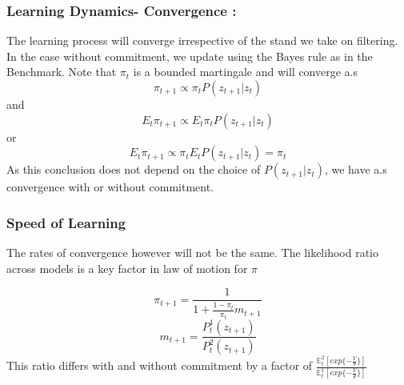\documentclass{beamer}
\theoremstyle{Definition}
\begin{document}
\begin{frame}
\frametitle{Learning Dynamics- Convergence : }

The learning process will converge irrespective of the stand we take on filtering. In the case without commitment, we update using the Bayes rule as in the Benchmark. Note that $\pi_{t}$ is a bounded martingale and will converge a.s
	\[\pi_{t+1}\propto \pi_{t}P(z_{t+1}|z_{t})\]
	and 
	\[E_t\pi_{t+1}\propto E_t\pi_{t}P(z_{t+1}|z_{t})\]
	or 
	\[E_t\pi_{t+1}\propto \pi_{t}E_tP(z_{t+1}|z_{t}) = \pi_t\]
\noindent As this conclusion does not depend on the choice of $P(z_{t+1}|z_{t})$, we have a.s convergence with or without commitment. 
\end{frame}

\begin{frame}
\frametitle{Speed of Learning}
The rates of convergence however will not be the same. The likelihood ratio across models is a key factor in law of motion for $\pi$

\[\pi_{t+1}=\frac{1}{1+\frac{1-\pi_t}{\pi_t}m_{t+1}}\]
\[m_{t+1}=\frac{P^{1}_t(z_{t+1})}{P^{2}_t(z_{t+1})}	\]
This ratio differs with and without commitment by a factor of $\frac{\mathbb{E}^2_t[exp\{-\frac{V}{\theta}\}]}{\mathbb{E}^1_t[exp\{-\frac{V}{\theta}\}]}$

\end{frame}
\end{document}
